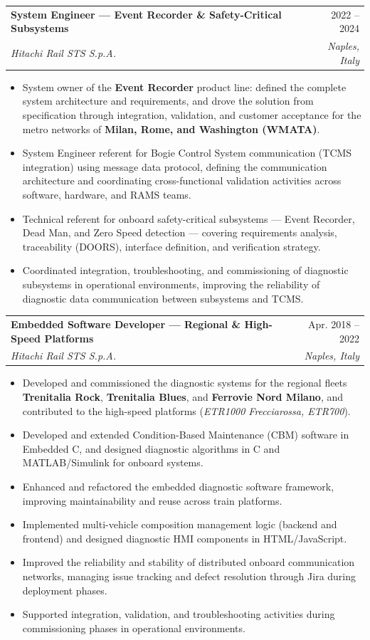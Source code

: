 \documentclass[letterpaper,10pt]{article}
\makeatletter
\newcommand{\resumeItem}[1]{
  \item\small{
    {#1 \vspace{-2pt}}
  }
}
\newcommand{\resumeSubheading}[4]{
  \vspace{-2pt}\item
    \begin{tabular*}{0.97\textwidth}[t]{l@{\extracolsep{\fill}}r}
      \textbf{#1} & #2 \\
      \textit{\small#3} & \textit{\small #4} \\
    \end{tabular*}\vspace{-3pt}
}
\newcommand{\resumeItemListStart}{\begin{itemize}[rightmargin=0.1in]\vspace{-3pt}}
\newcommand{\resumeItemListEnd}{\end{itemize}\vspace{-3pt}}
\makeatother
\begin{document}
    \resumeSubheading
        {System Engineer --- Event Recorder \& Safety-Critical Subsystems}{2022 -- 2024}
        {Hitachi Rail STS S.p.A.}{Naples, Italy}
        \resumeItemListStart
          \resumeItem{
            System owner of the \textbf{Event Recorder} product line: defined the complete system
            architecture and requirements, and drove the solution from specification through
            integration, validation, and customer acceptance for the metro networks of
            \textbf{Milan, Rome, and Washington (WMATA)}.
          }
          \resumeItem{
            System Engineer referent for Bogie Control System communication (TCMS integration) using
            message data protocol, defining the communication architecture and coordinating
            cross-functional validation activities across software, hardware, and RAMS teams.
          }
          \resumeItem{
            Technical referent for onboard safety-critical subsystems --- Event Recorder, Dead Man,
            and Zero Speed detection --- covering requirements analysis, traceability (DOORS),
            interface definition, and verification strategy.
          }
          \resumeItem{
            Coordinated integration, troubleshooting, and commissioning of diagnostic subsystems in
            operational environments, improving the reliability of diagnostic data communication
            between subsystems and TCMS.
          }
        \resumeItemListEnd

    \resumeSubheading
        {Embedded Software Developer --- Regional \& High-Speed Platforms}{Apr. 2018 -- 2022}
        {Hitachi Rail STS S.p.A.}{Naples, Italy}
        \resumeItemListStart
          \resumeItem{
            Developed and commissioned the diagnostic systems for the regional fleets
            \textbf{Trenitalia Rock}, \textbf{Trenitalia Blues}, and \textbf{Ferrovie Nord Milano},
            and contributed to the high-speed platforms (\textit{ETR1000 Frecciarossa, ETR700}).
          }
          \resumeItem{
            Developed and extended Condition-Based Maintenance (CBM) software in Embedded C, and
            designed diagnostic algorithms in C and MATLAB/Simulink for onboard systems.
          }
          \resumeItem{
            Enhanced and refactored the embedded diagnostic software framework, improving
            maintainability and reuse across train platforms.
          }
          \resumeItem{
            Implemented multi-vehicle composition management logic (backend and frontend) and
            designed diagnostic HMI components in HTML/JavaScript.
          }
          \resumeItem{
            Improved the reliability and stability of distributed onboard communication networks,
            managing issue tracking and defect resolution through Jira during deployment phases.
          }
          \resumeItem{
            Supported integration, validation, and troubleshooting activities during commissioning
            phases in operational environments.
          }
        \resumeItemListEnd
\end{document}
